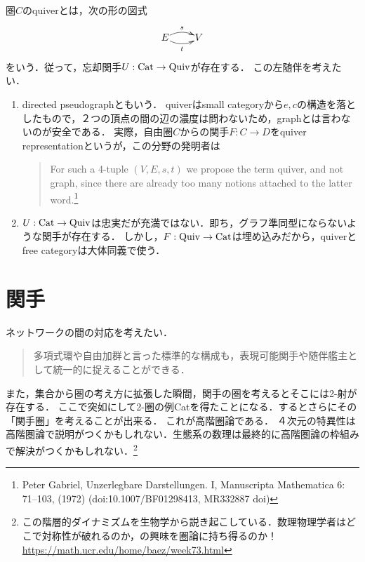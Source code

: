 \documentclass[uplatex,dvipdfmx]{jsreport}
\begin{document}
\begin{definition}[quiver]
    圏$C$のquiverとは，次の形の図式
    \[\xymatrix@1{
        E\ar@/^/[r]^-s\ar@/_/[r]_-t&V
    }\]
    をいう．従って，忘却関手$U:\mathrm{Cat}\to\mathrm{Quiv}$が存在する．
    この左随伴を考えたい．
\end{definition}
\begin{remark}\mbox{}
    \begin{enumerate}
        \item directed pseudographともいう．
        quiverはsmall categoryから$e,c$の構造を落としたもので，２つの頂点の間の辺の濃度は問わないため，graphとは言わないのが安全である．
        実際，自由圏$C$からの関手$F:C\to D$をquiver representationというが，この分野の発明者は
        \begin{quote}
            For such a 4-tuple $(V,E,s,t)$ we propose the term quiver, and not graph, since there are already too many notions attached to the latter word.\footnote{Peter Gabriel, Unzerlegbare Darstellungen. I, Manuscripta Mathematica 6: 71–103, (1972) (doi:10.1007/BF01298413, MR332887 doi)}
        \end{quote}
        \item $U:\mathrm{Cat}\to\mathrm{Quiv}$は忠実だが充満ではない．即ち，グラフ準同型にならないような関手が存在する．
        しかし，$F:\mathrm{Quiv}\to\mathrm{Cat}$は埋め込みだから，quiverとfree categoryは大体同義で使う．
    \end{enumerate}
\end{remark}

\section{関手}

\begin{tcolorbox}[colframe=ForestGreen, colback=ForestGreen!10!white, breakable ,colbacktitle=ForestGreen!40!white, coltitle=black,fonttitle=\bfseries\sffamily,
    title=]
    ネットワークの間の対応を考えたい．
    \begin{quotation}
        多項式環や自由加群と言った標準的な構成も，表現可能関手や随伴艦主として統一的に捉えることができる．\cite{数学原論}
    \end{quotation}
    また，集合から圏の考え方に拡張した瞬間，関手の圏を考えるとそこには2-射が存在する．
    ここで突如にして2-圏の例Catを得たことになる．するとさらにその「関手圏」を考えることが出来る．
    これが高階圏論である．
    ４次元の特異性は高階圏論で説明がつくかもしれない．生態系の数理は最終的に高階圏論の枠組みで解決がつくかもしれない．\footnote{この階層的ダイナミズムを生物学から説き起こしている．数理物理学者はどこで対称性が破れるのか，の興味を圏論に持ち得るのか！\url{https://math.ucr.edu/home/baez/week73.html}}
\end{tcolorbox}
\end{document}
